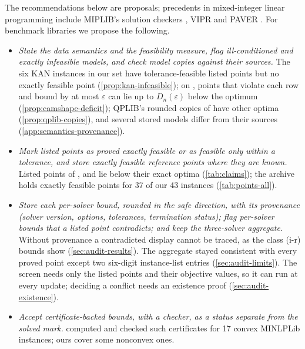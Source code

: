 The recommendations below are proposals; precedents in mixed-integer linear programming include MIPLIB's solution checkers \citep{koch2011-miplib-2010-mixed-integer-programming,gleixner2021-miplib-2017-data-driven-compilation}, VIPR \citep{cheung2017-verifying-integer-programming-results} and PAVER \citep{bussieck2014-paver-2-0-an-open}.
For benchmark libraries we propose the following.
\begin{itemize}\setlength{\itemsep}{0pt}\setlength{\parsep}{0pt}
\item \emph{State the data semantics and the feasibility measure, flag ill-conditioned and exactly infeasible models, and check model copies against their sources.}
The six KAN instances in our set have tolerance-feasible listed points but no exactly feasible point (\cref{prop:kan-infeasible}); on , points that violate each row and bound by at most $\varepsilon$ can lie up to $D_n(\varepsilon)$ below the optimum (\cref{prop:camshape-deficit}); QPLIB's rounded copies of  have other optima (\cref{prop:qplib-copies}), and several stored models differ from their sources (\cref{app:semantics-provenance}).
\item \emph{Mark listed points as proved exactly feasible or as feasible only within a tolerance, and store exactly feasible reference points where they are known.}
Listed points of ,  and  lie below their exact optima (\cref{tab:claims}); the archive holds exactly feasible points for 37 of our 43 instances (\cref{tab:points-all}).
\item \emph{Store each per-solver bound, rounded in the safe direction, with its provenance (solver version, options, tolerances, termination status); flag per-solver bounds that a listed point contradicts; and keep the three-solver aggregate.}
Without provenance a contradicted display cannot be traced, as the class (i-r) bounds show (\cref{sec:audit-results}).
The aggregate stayed consistent with every proved point except two six-digit instance-list entries (\cref{sec:audit-limits}).
The screen needs only the listed points and their objective values, so it can run at every update; deciding a conflict needs an existence proof (\cref{sec:audit-existence}).
\item \emph{Accept certificate-backed bounds, with a checker, as a status separate from the solved mark.}
 computed and checked such certificates for 17 convex MINLPLib instances; ours cover some nonconvex ones.
\end{itemize}
